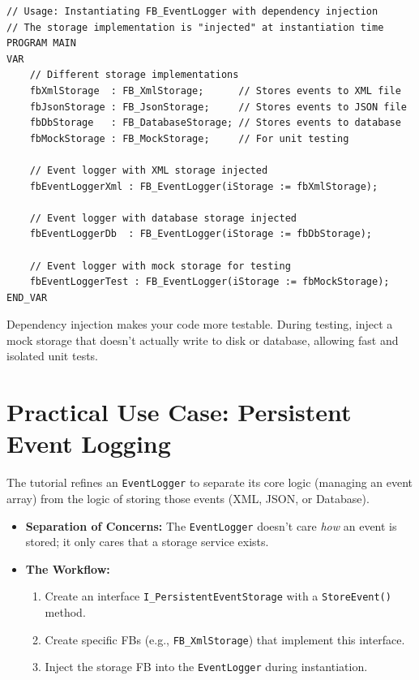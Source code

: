 \documentclass[11pt,a4paper]{article}
\begin{document}
\begin{lstlisting}
// Usage: Instantiating FB_EventLogger with dependency injection
// The storage implementation is "injected" at instantiation time
PROGRAM MAIN
VAR
    // Different storage implementations
    fbXmlStorage  : FB_XmlStorage;      // Stores events to XML file
    fbJsonStorage : FB_JsonStorage;     // Stores events to JSON file
    fbDbStorage   : FB_DatabaseStorage; // Stores events to database
    fbMockStorage : FB_MockStorage;     // For unit testing
    
    // Event logger with XML storage injected
    fbEventLoggerXml : FB_EventLogger(iStorage := fbXmlStorage);
    
    // Event logger with database storage injected
    fbEventLoggerDb  : FB_EventLogger(iStorage := fbDbStorage);
    
    // Event logger with mock storage for testing
    fbEventLoggerTest : FB_EventLogger(iStorage := fbMockStorage);
END_VAR
\end{lstlisting}

\begin{tipbox}
Dependency injection makes your code more testable. During testing, inject a mock storage that doesn't actually write to disk or database, allowing fast and isolated unit tests.
\end{tipbox}

\section{Practical Use Case: Persistent Event Logging}

The tutorial refines an \texttt{EventLogger} to separate its core logic (managing an event array) from the logic of storing those events (XML, JSON, or Database).

\begin{itemize}[leftmargin=*]
    \item \textbf{Separation of Concerns:} The \texttt{EventLogger} doesn't care \textit{how} an event is stored; it only cares that a storage service exists.
    
    \item \textbf{The Workflow:}
    \begin{enumerate}
        \item Create an interface \texttt{I\_PersistentEventStorage} with a \texttt{StoreEvent()} method.
        \item Create specific FBs (e.g., \texttt{FB\_XmlStorage}) that implement this interface.
        \item Inject the storage FB into the \texttt{EventLogger} during instantiation.
    \end{enumerate}
\end{itemize}
\end{document}
